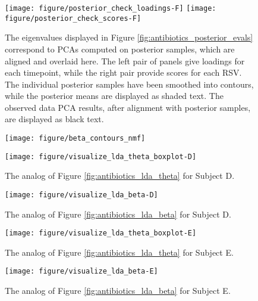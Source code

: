 \documentclass[oupdraft]{bio}
\begin{document}
\begin{figure}[!p]
  \centering
  \texttt{[image: figure/posterior\_check\_loadings-F]}
  \texttt{[image: figure/posterior\_check\_scores-F]}
  \caption{The eigenvalues displayed in Figure
    \ref{fig:antibiotics_posterior_evals} correspond to PCAs computed on
    posterior samples, which are aligned and overlaid here. The left pair of
    panels give loadings for each timepoint, while the right pair provide scores
    for each RSV. The individual posterior samples have been smoothed into
    contours, while the posterior means are displayed as shaded text. The
    observed data PCA results, after alignment with posterior samples, are
    displayed as black text. \label{fig:antibiotics_posterior_pca} }
\end{figure}

\begin{figure}[!p]
  \centering
  \texttt{[image: figure/beta\_contours\_nmf]}
  \caption{\label{fig:zinf_contours} }
\end{figure}

\begin{figure}[!p]
  \centering\texttt{[image: figure/visualize\_lda\_theta\_boxplot-D]}
  \caption{The analog of Figure \ref{fig:antibiotics_lda_theta} for Subject D.}
\end{figure}

\begin{figure}[!p]
  \centering\texttt{[image: figure/visualize\_lda\_beta-D]}
  \caption{The analog of Figure \ref{fig:antibiotics_lda_beta} for Subject D.}
\end{figure}

\begin{figure}[!p]
  \centering\texttt{[image: figure/visualize\_lda\_theta\_boxplot-E]}
  \caption{The analog of Figure \ref{fig:antibiotics_lda_theta} for Subject E.}
\end{figure}

\begin{figure}[!p]
  \centering\texttt{[image: figure/visualize\_lda\_beta-E]}
  \caption{The analog of Figure \ref{fig:antibiotics_lda_beta} for Subject E.}
\end{figure}
\end{document}
